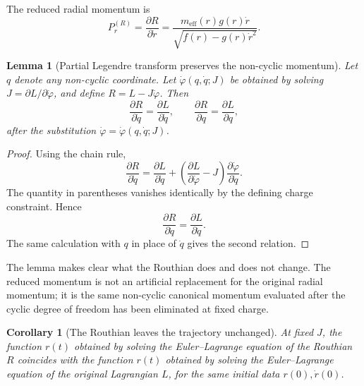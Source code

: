 \documentclass[11pt,a4paper]{article}
\theoremstyle{plain}
\newtheorem{lemma}[proposition]{Lemma}
\newtheorem{corollary}[proposition]{Corollary}
\theoremstyle{definition}
\theoremstyle{remark}
\newcommand{\PrR}{P_r^{(R)}}
\newcommand{\meff}{m_{\mathrm{eff}}}
\begin{document}
The reduced radial momentum is
\begin{equation}
\boxed{
\PrR
=
\frac{\partial R}{\partial\dot r}
=
\frac{
\meff(r)g(r)\dot r
}{
\sqrt{f(r)-g(r)\dot r^2}
}.
}
\label{eq:reduced-radial-momentum}
\end{equation}

\begin{lemma}[Partial Legendre transform preserves the non-cyclic momentum]
\label{lemma:routhian-momentum}
Let $q$ denote any non-cyclic coordinate. Let $\dot\varphi(q,\dot q;J)$ be obtained by solving
$J=\partial L/\partial\dot\varphi$, and define $R=L-J\dot\varphi$. Then
\begin{equation*}
\frac{\partial R}{\partial\dot q}
=
\frac{\partial L}{\partial\dot q},
\qquad
\frac{\partial R}{\partial q}
=
\frac{\partial L}{\partial q},
\end{equation*}
after the substitution $\dot\varphi=\dot\varphi(q,\dot q;J)$.
\end{lemma}

\begin{proof}
Using the chain rule,
\begin{equation*}
\frac{\partial R}{\partial\dot q}
=
\frac{\partial L}{\partial\dot q}
+
\left(
\frac{\partial L}{\partial\dot\varphi}-J
\right)
\frac{\partial\dot\varphi}{\partial\dot q}.
\end{equation*}
The quantity in parentheses vanishes identically by the defining charge constraint. Hence
\begin{equation*}
\frac{\partial R}{\partial\dot q}
=
\frac{\partial L}{\partial\dot q}.
\end{equation*}
The same calculation with $q$ in place of $\dot q$ gives the second relation.
\end{proof}

The lemma makes clear what the Routhian does and does not change. The reduced momentum is not an artificial replacement for the original radial momentum; it is the same non-cyclic canonical momentum evaluated after the cyclic degree of freedom has been eliminated at fixed charge.

\begin{corollary}[The Routhian leaves the trajectory unchanged]
\label{cor:same-trajectory}
At fixed $J$, the function $r(t)$ obtained by solving the Euler--Lagrange equation of the Routhian $R$ coincides with the function $r(t)$ obtained by solving the Euler--Lagrange equation of the original Lagrangian $L$, for the same initial data $r(0),\dot r(0)$.
\end{corollary}
\end{document}
